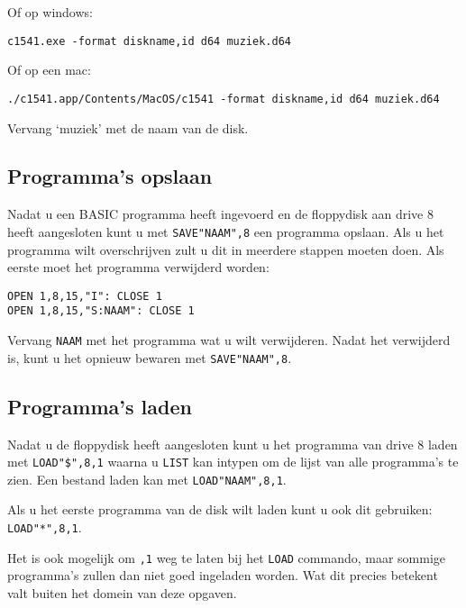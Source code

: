 Of op windows:

\begin{lstlisting}
c1541.exe -format diskname,id d64 muziek.d64
\end{lstlisting}

Of op een mac:

\begin{lstlisting}
./c1541.app/Contents/MacOS/c1541 -format diskname,id d64 muziek.d64
\end{lstlisting}

Vervang `muziek' met de naam van de disk.

\subsection{Programma's opslaan}

Nadat u een BASIC programma heeft ingevoerd en de floppydisk aan drive 8 heeft aangesloten kunt u met \verb:SAVE"NAAM",8: een programma opslaan.
Als u het programma wilt overschrijven zult u dit in meerdere stappen moeten doen.
Als eerste moet het programma verwijderd worden:

\begin{lstlisting}
OPEN 1,8,15,"I": CLOSE 1
OPEN 1,8,15,"S:NAAM": CLOSE 1
\end{lstlisting}

Vervang \verb:NAAM: met het programma wat u wilt verwijderen.
Nadat het verwijderd is, kunt u het opnieuw bewaren met \verb:SAVE"NAAM",8:.

\subsection{Programma's laden}

Nadat u de floppydisk heeft aangesloten kunt u het programma van drive 8 laden met \verb:LOAD"$",8,1: waarna u \verb:LIST: kan intypen om de lijst van alle programma's te zien.
Een bestand laden kan met \verb:LOAD"NAAM",8,1:.

Als u het eerste programma van de disk wilt laden kunt u ook dit gebruiken: \verb:LOAD"*",8,1:.

Het is ook mogelijk om \verb:,1: weg te laten bij het \verb:LOAD: commando, maar sommige programma's zullen dan niet goed ingeladen worden.
Wat dit precies betekent valt buiten het domein van deze opgaven.
